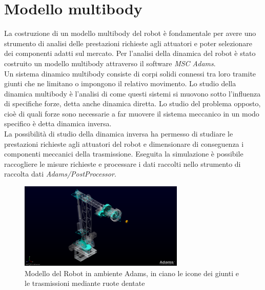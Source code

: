 \documentclass[%
corpo=11pt,
twoside,
 stile=classica,
oldstyle,
greek,%
]{toptesi}
\begin{document}
	\section{Modello multibody}
	La costruzione di un modello multibody del robot è fondamentale per avere uno strumento di analisi delle prestazioni richieste agli attuatori e poter selezionare dei componenti adatti sul mercato. 
	Per l'analisi della dinamica del robot è stato costruito un modello multibody attraverso il software \textit{MSC Adams}. \\
	Un sistema dinamico multibody consiste di corpi solidi connessi tra loro tramite giunti che ne limitano o impongono il relativo movimento. Lo studio della dinamica multibody è l’analisi di come questi sistemi si muovono sotto l’influenza di specifiche forze, detta anche dinamica diretta. Lo studio del problema opposto, cioè di quali forze sono necessarie a far muovere il sistema meccanico in un modo specifico è detta dinamica inversa.\\
	La possibilità di studio della dinamica inversa ha permesso di studiare le prestazioni richieste agli attuatori del robot e dimensionare di conseguenza i componenti meccanici della trasmissione. 
	Eseguita la simulazione è possibile raccogliere le misure richieste e processare i dati raccolti nello strumento di raccolta dati \textit{Adams/PostProcessor}.  
		\begin{figure}
		\centering
		\includegraphics[width=0.7\textwidth]{Screen/Model1.png}
		\caption{Modello del Robot in ambiente Adams, in ciano le icone dei giunti e le trasmissioni mediante ruote dentate}
		\label{fig:adamsmodel}
	\end{figure}
	
\end{document}
